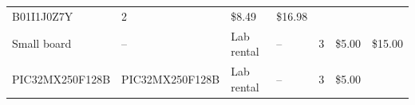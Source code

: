 \documentclass[]{article}
\begin{document}
\begin{longtable}[]{@{}lllllll@{}}
\begin{minipage}[t]{0.17\columnwidth}
B01I1J0Z7Y\strut
\end{minipage} & \begin{minipage}[t]{0.11\columnwidth}\raggedright
2\strut
\end{minipage} & \begin{minipage}[t]{0.06\columnwidth}\raggedright
\$8.49\strut
\end{minipage} & \begin{minipage}[t]{0.07\columnwidth}\raggedright
\$16.98\strut
\end{minipage}\tabularnewline
\begin{minipage}[t]{0.15\columnwidth}\raggedright
Small board\strut
\end{minipage} & \begin{minipage}[t]{0.15\columnwidth}\raggedright
--\strut
\end{minipage} & \begin{minipage}[t]{0.10\columnwidth}\raggedright
Lab rental\strut
\end{minipage} & \begin{minipage}[t]{0.17\columnwidth}\raggedright
--\strut
\end{minipage} & \begin{minipage}[t]{0.11\columnwidth}\raggedright
3\strut
\end{minipage} & \begin{minipage}[t]{0.06\columnwidth}\raggedright
\$5.00\strut
\end{minipage} & \begin{minipage}[t]{0.07\columnwidth}\raggedright
\$15.00\strut
\end{minipage}\tabularnewline
\begin{minipage}[t]{0.15\columnwidth}\raggedright
PIC32MX250F128B\strut
\end{minipage} & \begin{minipage}[t]{0.15\columnwidth}\raggedright
PIC32MX250F128B\strut
\end{minipage} & \begin{minipage}[t]{0.10\columnwidth}\raggedright
Lab rental\strut
\end{minipage} & \begin{minipage}[t]{0.17\columnwidth}\raggedright
--\strut
\end{minipage} & \begin{minipage}[t]{0.11\columnwidth}\raggedright
3\strut
\end{minipage} & \begin{minipage}[t]{0.06\columnwidth}\raggedright
\$5.00\strut

\end{minipage}
\end{longtable}
\end{document}
